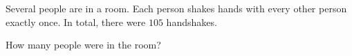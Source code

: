 Several people are in a room. Each person shakes hands with every other person exactly once. In total, there were $105$ handshakes.



How many people were in the room?
